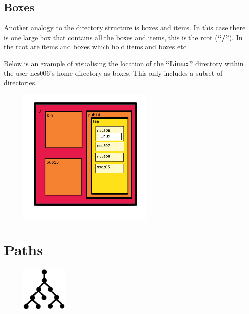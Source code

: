 \documentclass[
  letterpaper,
  DIV=11,
  numbers=noendperiod]{scrreprt}
\begin{document}
\hypertarget{boxes}{%
\subsection{Boxes}\label{boxes}}

Another analogy to the directory structure is boxes and items. In this
case there is one large box that contains all the boxes and items, this
is the root (\textbf{``/''}). In the root are items and boxes which hold
items and boxes etc.

Below is an example of visualising the location of the
\textbf{``Linux''} directory within the user ncs006's home directory as
boxes. This only includes a subset of directories.

\begin{figure}

{\centering \includegraphics[width=0.6\textwidth,height=\textheight]{figures/linux_box_structure.png}

}

\end{figure}

\hypertarget{paths}{%
\section{Paths}\label{paths}}

\begin{figure}

{\centering \includegraphics[width=0.2\textwidth,height=\textheight]{figures/paths.png}

}

\end{figure}
\end{document}
